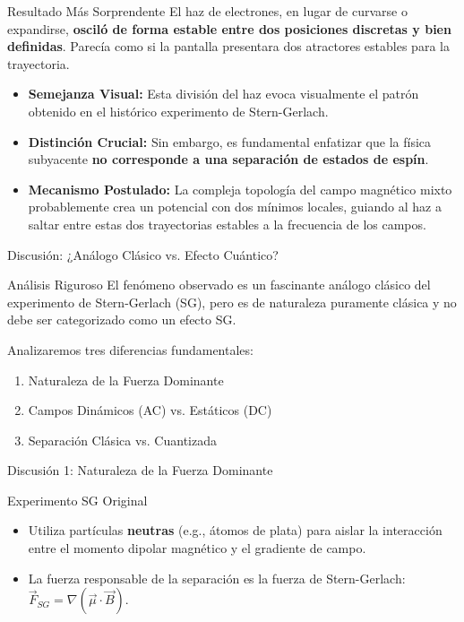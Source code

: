 \documentclass{beamer}
\begin{document}
\begin{frame}

  \begin{alertblock}{Resultado Más Sorprendente}
    El haz de electrones, en lugar de curvarse o expandirse, \textbf{osciló de forma estable entre dos posiciones discretas y bien definidas}. Parecía como si la pantalla presentara dos atractores estables para la trayectoria.
  \end{alertblock}

  \begin{itemize}
    \item \textbf{Semejanza Visual:} Esta división del haz evoca visualmente el patrón obtenido en el histórico experimento de Stern-Gerlach.
    \item \textbf{Distinción Crucial:} Sin embargo, es fundamental enfatizar que la física subyacente \textbf{no corresponde a una separación de estados de espín}.
    \item \textbf{Mecanismo Postulado:} La compleja topología del campo magnético mixto probablemente crea un potencial con dos mínimos locales, guiando al haz a saltar entre estas dos trayectorias estables a la frecuencia de los campos.
  \end{itemize}
\end{frame}

\begin{frame}{Discusión: ¿Análogo Clásico vs. Efecto Cuántico?}
  \begin{block}{Análisis Riguroso}
    El fenómeno observado es un fascinante análogo clásico del experimento de Stern-Gerlach (SG), pero es de naturaleza puramente clásica y no debe ser categorizado como un efecto SG.
  \end{block}

  Analizaremos tres diferencias fundamentales:
  \begin{enumerate}
    \item Naturaleza de la Fuerza Dominante
    \item Campos Dinámicos (AC) vs. Estáticos (DC)
    \item Separación Clásica vs. Cuantizada
  \end{enumerate}
\end{frame}

\begin{frame}{Discusión 1: Naturaleza de la Fuerza Dominante}
  \begin{block}{Experimento SG Original}
    \begin{itemize}
      \item Utiliza partículas \textbf{neutras} (e.g., átomos de plata) para aislar la interacción entre el momento dipolar magnético y el gradiente de campo.
      \item La fuerza responsable de la separación es la fuerza de Stern-Gerlach: $\vec{F}_{SG} = \nabla(\vec{\mu} \cdot \vec{B})$.
    \end{itemize}
  \end{block}

\end{frame}
\end{document}
